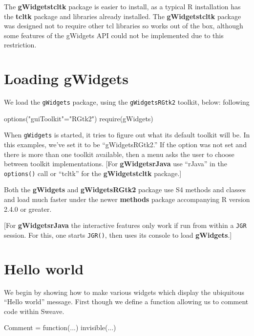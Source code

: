 \documentclass[12pt]{article}
\newcommand{\RCode}[1]{\texttt{#1}}
\newcommand{\RFunc}[1]{\texttt{#1()}}
\newcommand{\RPackage}[1]{\textbf{#1}}
\begin{document}
The \RPackage{gWidgetstcltk} package is easier to install, as a
typical R installation has the \RPackage{tcltk} package and libraries
already installed. The \RPackage{gWidgetstcltk} package was designed
not to require other tcl libraries so works out of the box, although
some features of the gWidgets API could not be implemented due to this
restriction.

\section{Loading gWidgets}
We  load the \RCode{gWidgets} package, using the \RCode{gWidgetsRGtk2}
toolkit, below:
following 
\begin{Scode}
  options("guiToolkit"="RGtk2")
  require(gWidgets)
\end{Scode}
When \RCode{gWidgets} is started, it tries to figure out what its
default toolkit will be. In this examples, we've set it to be
``gWidgetsRGtk2.'' If the option was not set and there is more than
one toolkit available, then a menu asks the user to choose between
toolkit implementations. [For \RPackage{gWidgetsrJava} use ``rJava''
in the \RFunc{options} call or ``tcltk'' for the
\RPackage{gWidgetstcltk} package.]

Both the \RPackage{gWidgets} and \RPackage{gWidgetsRGtk2} package use
S4 methods and classes and load much faster under the newer
\RPackage{methods} package accompanying R version 2.4.0 or greater.


[For \RPackage{gWidgetsrJava} the interactive features only work if
run from within a \RCode{JGR} session. For this, one starts
\RFunc{JGR}, then uses its console to load \RPackage{gWidgets}.]

\section{Hello world}

We begin by showing how to make various widgets which display the
ubiquitous ``Hello world'' message. First though we define a function
allowing us to comment code within Sweave.
\begin{Scode}
  Comment = function(...) invisible(...)  
\end{Scode}
\end{document}
